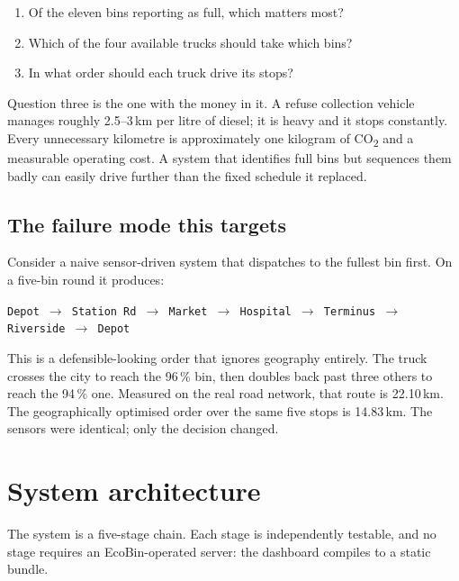 \documentclass[11pt,a4paper]{article}
\newcommand{\co}{CO\textsubscript{2}}
\begin{document}
\begin{enumerate}
  \item Of the eleven bins reporting as full, which matters most?
  \item Which of the four available trucks should take which bins?
  \item In what order should each truck drive its stops?
\end{enumerate}

Question three is the one with the money in it. A refuse collection
vehicle manages roughly 2.5--3\,km per litre of diesel; it is heavy and
it stops constantly. Every unnecessary kilometre is approximately one
kilogram of \co{} and a measurable operating cost. A system that
identifies full bins but sequences them badly can easily drive further
than the fixed schedule it replaced.

\subsection{The failure mode this targets}

Consider a naive sensor-driven system that dispatches to the fullest bin
first. On a five-bin round it produces:

\begin{center}\small
\texttt{Depot $\rightarrow$ Station Rd $\rightarrow$ Market $\rightarrow$ Hospital $\rightarrow$ Terminus $\rightarrow$ Riverside $\rightarrow$ Depot}
\end{center}

This is a defensible-looking order that ignores geography entirely. The
truck crosses the city to reach the 96\,\% bin, then doubles back past
three others to reach the 94\,\% one. Measured on the real road network,
that route is 22.10\,km. The geographically optimised order over the same
five stops is 14.83\,km. The sensors were identical; only the decision
changed.

\section{System architecture}

The system is a five-stage chain. Each stage is independently testable,
and no stage requires an EcoBin-operated server: the dashboard compiles
to a static bundle.
\end{document}
